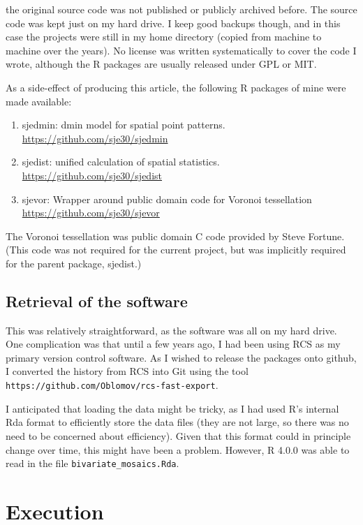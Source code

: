 the original source code was not published or publicly archived before.
The source code was kept just on my hard drive. I keep good backups
though, and in this case the projects were still in my home directory
(copied from machine to machine over the years). No license was written
systematically to cover the code I wrote, although the R packages are
usually released under GPL or MIT.

As a side-effect of producing this article, the following R packages of
mine were made available:

\begin{enumerate}
\item
  sjedmin: dmin model for spatial point patterns.
  \url{https://github.com/sje30/sjedmin}
\item
  sjedist: unified calculation of spatial statistics.
  \url{https://github.com/sje30/sjedist}
\item
  sjevor: Wrapper around public domain code for Voronoi tessellation
  \url{https://github.com/sje30/sjevor}
\end{enumerate}

The Voronoi tessellation was public domain C code provided by Steve
Fortune\supercite{Fortune1987-kg}. (This code was not required for the current
project, but was implicitly required for the parent package, sjedist.)

\subsection{Retrieval of the software}

This was relatively straightforward, as the software was all on my hard
drive. One complication was that until a few years ago, I had been using
RCS as my primary version control software. As I wished to release the
packages onto github, I converted the history from RCS into Git using
the tool \texttt{https://github.com/Oblomov/rcs-fast-export}.

I anticipated that loading the data might be tricky, as I had used R's
internal Rda format to efficiently store the data files (they are not
large, so there was no need to be concerned about efficiency). Given
that this format could in principle change over time, this might have
been a problem. However, R 4.0.0 was able to read in the file
\texttt{bivariate\_mosaics.Rda}.

\section{Execution}

